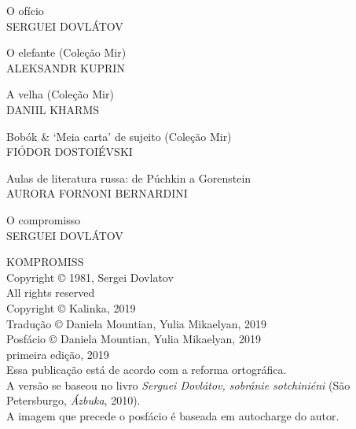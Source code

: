 \noindent{}O ofício\\
SERGUEI DOVLÁTOV
\medskip

\noindent{}O elefante (Coleção Mir)\\
ALEKSANDR KUPRIN
\medskip

\noindent{}A velha (Coleção Mir)\\
DANIIL KHARMS 
\medskip

\noindent{}Bobók \& `Meia carta' de sujeito (Coleção Mir)\\
FIÓDOR DOSTOIÉVSKI
\medskip

\noindent{}Aulas de literatura russa: de Púchkin a Gorenstein \\
AURORA FORNONI BERNARDINI
\medskip

\noindent{}O compromisso\\
SERGUEI DOVLÁTOV

\newpage
\pagestyle{empty}
\MyriadPro
\scriptsize
\begin{center}
KOMPROMISS\\[6pt]

Copyright © 1981, Sergei Dovlatov\\[6pt]

All rights reserved\\[20pt]

Copyright © Kalinka, 2019\\[6pt]

Tradução © Daniela Mountian, Yulia Mikaelyan, 2019\\[6pt]

Posfácio © Daniela Mountian, Yulia Mikaelyan, 2019\\[6pt]

primeira edição, 2019\\[40pt]


Essa publicação está de acordo com a reforma ortográfica.\\[6pt]
A versão se baseou no livro \emph{Serguei Dovlátov, sobránie sotchiniéni} (São Petersburgo, \emph{Ázbuka}, 2010).\\[6pt]	
A imagem que precede o posfácio é baseada em autocharge do autor.\\[20pt]
\end{center}


\bigskip

